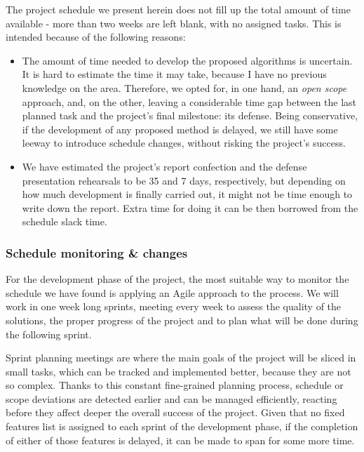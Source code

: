 The project schedule we present herein does not fill up the total amount of time available - more than two weeks are left blank, with no assigned tasks. This is intended because of the following reasons:

\begin{itemize}
	\item The amount of time needed to develop the proposed algorithms is uncertain. It is hard to estimate the time it may take, because I have no previous knowledge on the area. Therefore, we opted for, in one hand, an \textit{open scope} approach, and, on the other, leaving a considerable time gap between the last planned task and the project’s final milestone: its defense. Being conservative, if the development of any proposed method is delayed, we still have some leeway to introduce schedule changes, without risking the project’s success.
	
	\item We have estimated the project’s report confection and the defense presentation rehearsals to be 35 and 7 days, respectively, but depending on how much development is finally carried out, it might not be time enough to write down the report. Extra time for doing it can be then borrowed from the schedule slack time.
	
\end{itemize}

\subsubsection{Schedule monitoring \& changes}

For the development phase of the project, the most suitable way to monitor the schedule we have found is applying an Agile approach to the process. We will work in one week long sprints, meeting every week to assess the quality of the solutions, the proper progress of the project and to plan what will be done during the following sprint.

Sprint planning meetings are where the main goals of the project will be sliced in small tasks, which can be tracked and implemented better, because they are not so complex. Thanks to this constant fine-grained planning process, schedule or scope deviations are detected earlier and can be managed efficiently, reacting before they affect deeper the overall success of the project. Given that no fixed features list is assigned to each sprint of the development phase, if the completion of either of those features is delayed, it can be made to span for some more time.

